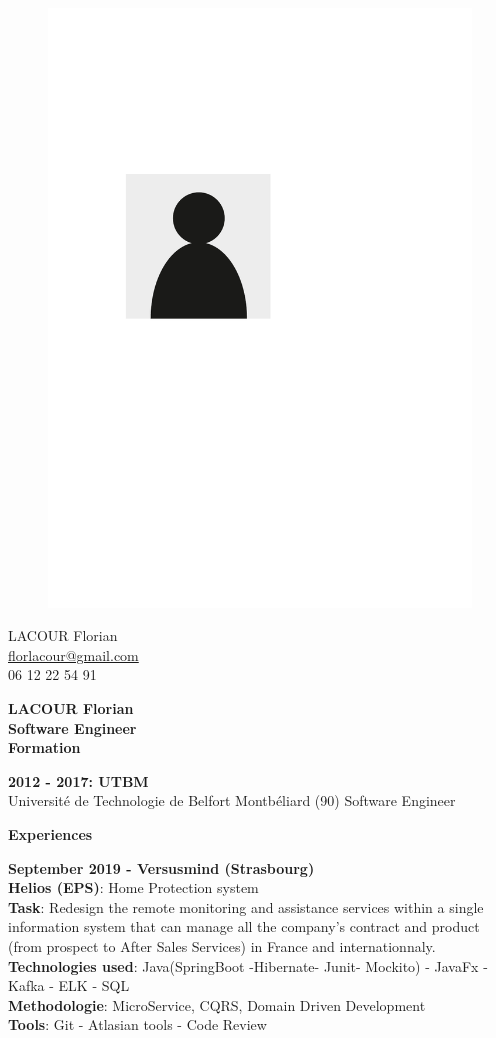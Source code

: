 \documentclass[a4paper,11pt,final]{memoir}
\newcommand{\CVSection}[1]
	{\Large\textbf{#1}\par
	\normalsize\normalfont}
\newcommand{\CVItem}[1]
	{\textbf{\color{RoyalBlue} #1}}
\begin{document}
\begin{figure}
	\hfill
	\includegraphics[width=0.6\columnwidth]{photo}
	\vspace{-9cm}
\end{figure}

\begin{flushright}\small
	LACOUR Florian \\
	\url{florlacour@gmail.com}  \\
	06 12 22 54 91
\end{flushright}\normalsize
\framebreak


\Huge\bfseries {\color{RoyalBlue}  LACOUR Florian} \\
\Large\bfseries  Software Engineer \ \\
\CVSection{Formation}
\CVItem{2012  - 2017: UTBM }\\
Université de Technologie de Belfort Montbéliard (90) Software Engineer

\CVSection{Experiences}

\CVItem{September 2019 - Versusmind (Strasbourg) }\\
\textbf{Helios (EPS)}: Home Protection system\\
\textbf{Task}: Redesign the remote monitoring and assistance services within a single information system that can manage all the company's contract and product (from prospect to After Sales Services) in France and internationnaly.\\
\textbf{Technologies used}: Java(SpringBoot -Hibernate- Junit- Mockito) - JavaFx - Kafka - ELK - SQL\\
\textbf{Methodologie}: MicroService, CQRS, Domain Driven Development \\
\textbf{Tools}: Git - Atlasian tools - Code Review
\end{document}
